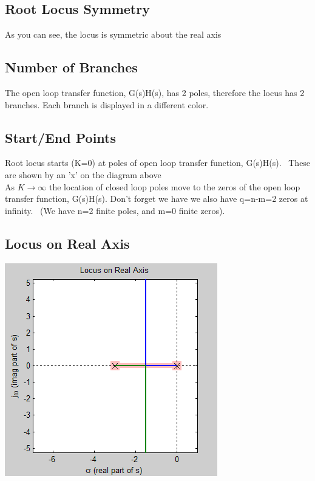 \documentclass[16pt]{article}
\begin{document}
\subsection[Root Locus
Symmetry]{\texorpdfstring{\protect\hypertarget{RuleSym}{}{}Root Locus
Symmetry}{Root Locus Symmetry}}\label{root-locus-symmetry}

As you can see, the locus is symmetric about the real axis\\

\subsection[Number of
Branches]{\texorpdfstring{\protect\hypertarget{RuleNum}{}{}Number of
Branches}{Number of Branches}}\label{number-of-branches}

The open loop transfer function, G(s)H(s), has 2 poles, therefore the
locus has 2 branches. Each branch is displayed in a different color.\\

\subsection[Start/End
Points]{\texorpdfstring{\protect\hypertarget{RuleStart}{}{}Start/End
Points}{Start/End Points}}\label{startend-points}

Root locus starts (K=0) at poles of open loop transfer function,
G(s)H(s).~ These are shown by an 'x' on the diagram
above\\[2\baselineskip]As $K\rightarrow \infty$ the location of closed loop poles move to
the zeros of the open loop transfer function, G(s)H(s). Don't forget we
have we also have q=n-m=2 zeros at infinity.~ (We have n=2 finite poles,
and m=0 finite zeros).\\

\subsection[Locus on Real
Axis]{\texorpdfstring{\protect\hypertarget{RuleReal}{}{}Locus on Real
Axis}{Locus on Real Axis}}\label{locus-on-real-axis}

\includegraphics{./Root Locus_ Example 1_files/RLRealAxis.png}
\end{document}
